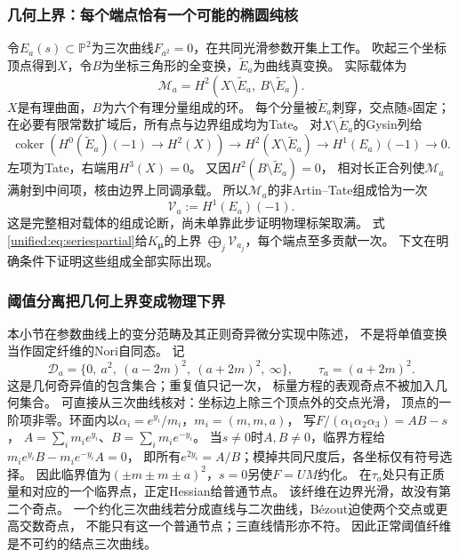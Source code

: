 \documentclass[11pt,a4paper,oneside]{ctexart}
\theoremstyle{cnplain}
\theoremstyle{definition}
\theoremstyle{remark}
\numberwithin{equation}{section}
\begin{document}
\subsubsection{几何上界：每个端点恰有一个可能的椭圆纯核}
令$E_a(s)\subset\mathbb P^2$为三次曲线$F_{a^2}=0$，在共同光滑参数开集上工作。
吹起三个坐标顶点得到$X$，令$B$为坐标三角形的全变换，$\widetilde E_a$为曲线真变换。
实际载体为
\[
 \mathcal M_a
 =H^2(X\setminus\widetilde E_a,\ B\setminus\widetilde E_a).
\]
$X$是有理曲面，$B$为六个有理分量组成的环。
每个分量被$\widetilde E_a$刺穿，交点随$s$固定；
在必要有限常数扩域后，所有点与边界组成均为Tate。
对$X\setminus\widetilde E_a$的Gysin列给
\[
 \operatorname{coker}\!\left(H^0(\widetilde E_a)(-1)\to H^2(X)\right)
 \longrightarrow H^2(X\setminus\widetilde E_a)
 \longrightarrow H^1(E_a)(-1)\longrightarrow0.
\]
左项为Tate，右端用$H^3(X)=0$。
又因$H^2(B\setminus\widetilde E_a)=0$，
相对长正合列使$\mathcal M_a$满射到中间项，核由边界上同调承载。
所以$\mathcal M_a$的非Artin--Tate组成恰为一次
\[
 \mathcal V_a:=H^1(E_a)(-1).
\]
这是完整相对载体的组成论断，尚未单靠此步证明物理标架取满。
式\eqref{unified:eq:seriespartial}给$K_{\boldsymbol\mu}$的上界
$\bigoplus_j\mathcal V_{a_j}$，每个端点至多贡献一次。
下文在明确条件下证明这些组成全部实际出现。

\subsubsection{阈值分离把几何上界变成物理下界}
本小节在参数曲线上的变分范畴及其正则奇异微分实现中陈述，
不是将单值变换当作固定纤维的Nori自同态。
记
\[
 \mathcal D_a=\{0,\ a^2,\ (a-2m)^2,\ (a+2m)^2,\ \infty\},
 \qquad \tau_a=(a+2m)^2.
\]
这是几何奇异值的包含集合；重复值只记一次，
标量方程的表观奇点不被加入几何集合。
可直接从三次曲线核对：坐标边上除三个顶点外的交点光滑，
顶点的一阶项非零。环面内以$\alpha_i=e^{y_i}/m_i$，$m_i=(m,m,a)$，
写$F/(\alpha_1\alpha_2\alpha_3)=AB-s$，
$A=\sum_i m_i e^{y_i}$、$B=\sum_i m_i e^{-y_i}$。
当$s\ne0$时$A,B\ne0$，临界方程给
$m_i e^{y_i}B-m_i e^{-y_i}A=0$，
即所有$e^{2y_i}=A/B$；模掉共同尺度后，各坐标仅有符号选择。
因此临界值为$(\pm m\pm m\pm a)^2$，$s=0$另使$F=UM$约化。
在$\tau_a$处只有正质量和对应的一个临界点，正定Hessian给普通节点。
该纤维在边界光滑，故没有第二个奇点。
一个约化三次曲线若分成直线与二次曲线，Bézout迫使两个交点或更高交数奇点，
不能只有这一个普通节点；三直线情形亦不符。
因此正常阈值纤维是不可约的结点三次曲线。
\end{document}
